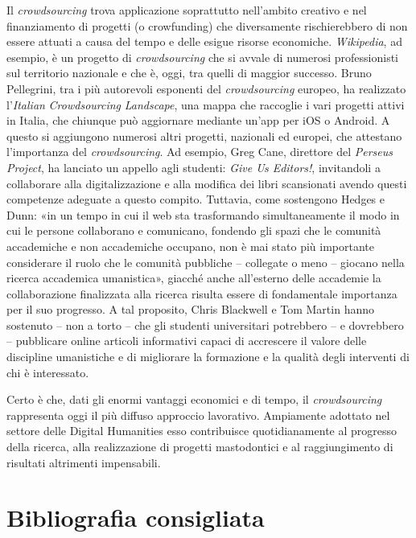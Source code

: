 \documentclass[
  b5paper,
  twoside,
  12pt,
  chapterprefix=false,
  bibliography=totocnumbered,
  parskip=false]{scrbook}
\begin{document}
Il \emph{crowdsourcing} trova applicazione soprattutto nell'ambito creativo e
nel finanziamento di progetti (o crowfunding) che diversamente
rischierebbero di non essere attuati a causa del tempo e delle esigue
risorse economiche. \emph{Wikipedia}, ad esempio, è un progetto di
\emph{crowdsourcing} che si avvale di numerosi professionisti sul territorio
nazionale e che è, oggi, tra quelli di maggior successo. Bruno
Pellegrini, tra i più autorevoli esponenti del \emph{crowdsourcing} europeo,
ha realizzato l'\emph{Italian} \emph{Crowdsourcing} \emph{Landscape}, una mappa che
raccoglie i vari progetti attivi in Italia, che chiunque può aggiornare
mediante un'app per iOS o Android. A questo si aggiungono numerosi altri
progetti, nazionali ed europei, che attestano l'importanza del
\emph{crowdsourcing}. Ad esempio, Greg Cane, direttore del \emph{Perseus Project},
ha lanciato un appello agli studenti: \emph{Give Us Editors!}, invitandoli a
collaborare alla digitalizzazione e alla modifica dei libri scansionati
avendo questi competenze adeguate a questo compito. Tuttavia, come
sostengono Hedges e Dunn: «in un tempo in cui il web sta trasformando
simultaneamente il modo in cui le persone collaborano e comunicano,
fondendo gli spazi che le comunità accademiche e non accademiche
occupano, non è mai stato più importante considerare il ruolo che le
comunità pubbliche -- collegate o meno -- giocano nella ricerca
accademica umanistica», giacché anche all'esterno delle accademie la
collaborazione finalizzata alla ricerca risulta essere di fondamentale
importanza per il suo progresso. A tal proposito, Chris Blackwell e Tom
Martin hanno sostenuto -- non a torto -- che gli studenti universitari
potrebbero -- e dovrebbero -- pubblicare online articoli informativi
capaci di accrescere il valore delle discipline umanistiche e di
migliorare la formazione e la qualità degli interventi di chi è
interessato.

Certo è che, dati gli enormi vantaggi economici e di tempo, il
\emph{crowdsourcing} rappresenta oggi il più diffuso approccio lavorativo.
Ampiamente adottato nel settore delle Digital Humanities esso
contribuisce quotidianamente al progresso della ricerca, alla
realizzazione di progetti mastodontici e al raggiungimento di risultati
altrimenti impensabili.

\hypertarget{bibliografia-consigliata-3}{%
\section*{Bibliografia consigliata}\label{bibliografia-consigliata-3}}
\end{document}
